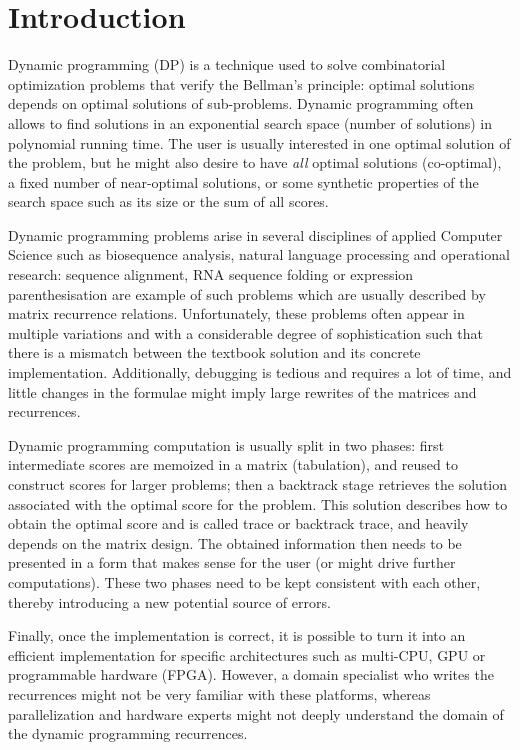\newpage
\setcounter{tocdepth}{2} \tableofcontents
\newpage
\section{Introduction} \label{intro}
Dynamic programming (DP) is a technique used to solve combinatorial optimization problems that verify the Bellman's principle\cite{bellman_principle}: optimal solutions depends on optimal solutions of sub-problems. Dynamic programming often allows to find solutions in an exponential search space (number of solutions) in polynomial running time. The user is usually interested in one optimal solution of the problem, but he might also desire to have \textit{all} optimal solutions (co-optimal), a fixed number of near-optimal solutions, or some synthetic properties of the search space such as its size or the sum of all scores.

Dynamic programming problems arise in several disciplines of applied Computer Science such as biosequence analysis, natural language processing and operational research: sequence alignment, RNA sequence folding or expression parenthesisation are example of such problems which are usually described by matrix recurrence relations. Unfortunately, these problems often appear in multiple variations and with a considerable degree of sophistication such that there is a mismatch between the textbook solution and its concrete implementation. Additionally, debugging is tedious and requires a lot of time, and little changes in the formulae might imply large rewrites of the matrices and recurrences\cite{gapc_yield}.

Dynamic programming computation is usually split in two phases: first intermediate scores are memoized in a matrix (tabulation), and reused to construct scores for larger problems; then a backtrack stage retrieves the solution associated with the optimal score for the problem. This solution describes how to obtain the optimal score and is called trace or backtrack trace, and heavily depends on the matrix design. The obtained information then needs to be presented in a form that makes sense for the user (or  might drive further computations). These two phases need to be kept consistent with each other, thereby introducing a new potential source of errors.

Finally, once the implementation is correct, it is possible to turn it into an efficient implementation for specific architectures such as multi-CPU, GPU or programmable hardware (FPGA). However, a domain specialist who writes the recurrences might not be very familiar with these platforms, whereas parallelization and hardware experts might not deeply understand the domain of the dynamic programming recurrences.

